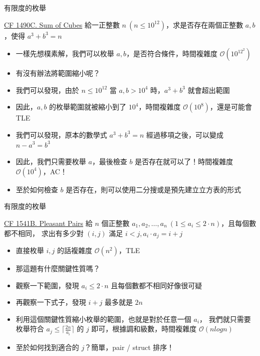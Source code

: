 \documentclass[aspectratio=169]{beamer}
\begin{document}
    \begin{frame}{有限度的枚舉}
        \begin{block}{\href{https://codeforces.com/problemset/problem/1490/C}{CF 1490C. Sum of Cubes}}
            給一正整數 $n\ (n \le 10^{12})$，求是否存在兩個正整數 $a, b$，使得 $a^3 + b^3 = n$
        \end{block}

        \begin{itemize}
            \item<1-> 一樣先想樸素解，我們可以枚舉 $a, b$，是否符合條件，時間複雜度 $\mathcal{O}(10^{12^2})$
            \item<2-> 有沒有辦法將範圍縮小呢？
            \item<3-> 我們可以發現，由於 $n \le 10^{12}$ 當 $a, b > 10^4$ 時，$a^3 + b^3$ 就會超出範圍
            \item<3-> 因此，$a, b$ 的枚舉範圍就被縮小到了 $10^4$，時間複雜度 $\mathcal{O}(10^8)$，還是可能會 TLE
            \item<4-> 我們可以發現，原本的數學式 $a^3 + b^3 = n$ 經過移項之後，可以變成 $n - a^3 = b^3$
            \item<4-> 因此，我們只需要枚舉 $a$，最後檢查 $b$ 是否存在就可以了！時間複雜度 $\mathcal{O}(10^4)$，AC！
            \item<4-> 至於如何檢查 $b$ 是否存在，則可以使用二分搜或是預先建立立方表的形式
        \end{itemize}
    \end{frame}

    \begin{frame}{有限度的枚舉}
        \begin{block}{\href{https://codeforces.com/problemset/problem/1541/B}{CF 1541B. Pleasant Pairs}}
            給 $n$ 個正整數 $a_1, a_2, \dots, a_n\ (1 \le a_i \le 2 \cdot n)$，且每個數都不相同，
            求出有多少對 $(i, j)$ 滿足 $i < j, a_i \cdot a_j = i + j$
        \end{block}

        \begin{itemize}
            \item<1-> 直接枚舉 $i, j$ 的話複雜度 $\mathcal{O}(n^2)$，TLE
            \item<2-> 那這題有什麼關鍵性質嗎？
            \item<3-> 觀察一下範圍，發現 $a_i \le 2 \cdot n$ 且每個數都不相同好像很可疑
            \item<4-> 再觀察一下式子，發現 $i + j$ 最多就是 $2n$
            \item<5-> 利用這個關鍵性質縮小枚舉的範圍，也就是對於任意一個 $a_i$，
            我們就只需要枚舉符合 $a_j \le \lceil \frac{2n}{a_i} \rceil$ 的 $j$ 即可，根據調和級數，時間複雜度 $\mathcal{O}(nlogn)$
            \item<6-> 至於如何找到適合的 $j$？簡單，pair / struct 排序！
        \end{itemize}
    \end{frame}
\end{document}
